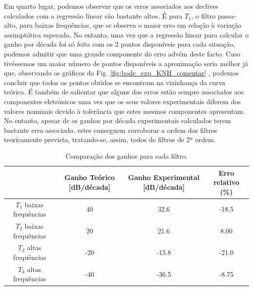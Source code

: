 Em quarto lugar, podemos observar que os erros associados aos declives calculados com a regressão linear são bastante altos. É para $T_1$, o filtro passa-alto, para baixas frequências, que se observa o maior erro em relação à variação assimptótica esperada. No entanto, uma vez que a regressão linear para calcular o ganho por década foi só feita com os 2 pontos disponíveis para cada situação, podemos admitir que uma grande componente do erro advém deste facto. Caso tivéssemos um maior número de pontos disponíveis a aproximação seria melhor já que, observando os gráficos da Fig. \ref{fig:bode_exp_KNH_comentar} , podemos concluir que todos os pontos obtidos se encontram na vizinhança da curva teórica. É também de salientar que alguns dos erros estão sempre associados aos componentes eletrónicos uma vez que os seus valores experimentais diferem dos valores nominais devido à tolerância que estes mesmos componentes apresentam. No entanto, apesar de os ganhos por década experimentais calculados terem bastante erro associado, estes conseguem corroborar a ordem dos filtros teoricamente prevista, tratando-se, assim, todos de filtros de 2ª ordem. 




\begin{table}[ht]
    \centering
    \caption{Comparação dos ganhos para cada filtro.}
    \begin{tabular}{cccc}
    \hline
         &Ganho Teórico [dB/década] & Ganho Experimental [dB/década] & Erro relativo (\%)\\
        \hline
        $T_1$ baixas frequências   & 40 & 32.6 &   -18.5\\
        $T_2$ baixas frequências   & 20 & 21.6 & 8.00 \\
        $T_2$ altas frequências   & -20 & -15.8 & -21.0 \\
        $T_3$ altas frequências   & -40 & -36.5 & -8.75 \\
    \hline
    \end{tabular}
    \label{tab:ganhos}
\end{table}

